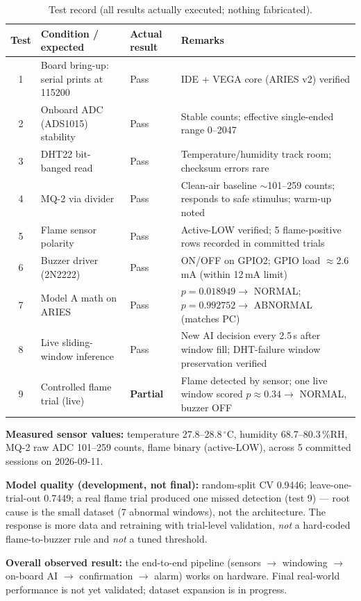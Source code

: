 \documentclass[11pt]{article}
\newcommand{\celsius}{\,$^\circ$C}
\begin{document}
\begin{table}[ht]
\centering
\scriptsize
\begin{tabularx}{\textwidth}{c X X X}
\toprule
\textbf{Test} & \textbf{Condition / expected} & \textbf{Actual result} & \textbf{Remarks} \\
\midrule
1 & Board bring-up: serial prints at 115200 & Pass & IDE + VEGA core (ARIES v2) verified \\
2 & Onboard ADC (ADS1015) stability & Pass & Stable counts; effective single-ended range 0--2047 \\
3 & DHT22 bit-banged read & Pass & Temperature/humidity track room; checksum errors rare \\
4 & MQ-2 via divider & Pass & Clean-air baseline $\sim$101--259 counts; responds to safe stimulus; warm-up noted \\
5 & Flame sensor polarity & Pass & Active-LOW verified; 5 flame-positive rows recorded in committed trials \\
6 & Buzzer driver (2N2222) & Pass & ON/OFF on GPIO2; GPIO load $\approx$2.6\,mA (within 12\,mA limit) \\
7 & Model A math on ARIES & Pass & $p=0.018949 \rightarrow$ NORMAL; $p=0.992752 \rightarrow$ ABNORMAL (matches PC) \\
8 & Live sliding-window inference & Pass & New AI decision every 2.5\,s after window fill; DHT-failure window preservation verified \\
9 & Controlled flame trial (live) & \textbf{Partial} & Flame detected by sensor; one live window scored $p \approx 0.34 \rightarrow$ NORMAL, buzzer OFF \\
\bottomrule
\end{tabularx}
\caption{Test record (all results actually executed; nothing fabricated).}
\end{table}

\textbf{Measured sensor values:} temperature 27.8--28.8\celsius{},
humidity 68.7--80.3\,\%RH, MQ-2 raw ADC 101--259 counts, flame binary
(active-LOW), across 5 committed sessions on 2026-09-11.

\textbf{Model quality (development, not final):} random-split CV
0.9446; leave-one-trial-out 0.7449; a real flame trial produced one
missed detection (test 9) --- root cause is the small dataset (7
abnormal windows), not the architecture. The response is more data and
retraining with trial-level validation, \emph{not} a hard-coded
flame-to-buzzer rule and \emph{not} a tuned threshold.

\textbf{Overall observed result:} the end-to-end pipeline (sensors
$\rightarrow$ windowing $\rightarrow$ on-board AI $\rightarrow$
confirmation $\rightarrow$ alarm) works on hardware. Final real-world
performance is not yet validated; dataset expansion is in progress.
\end{document}
